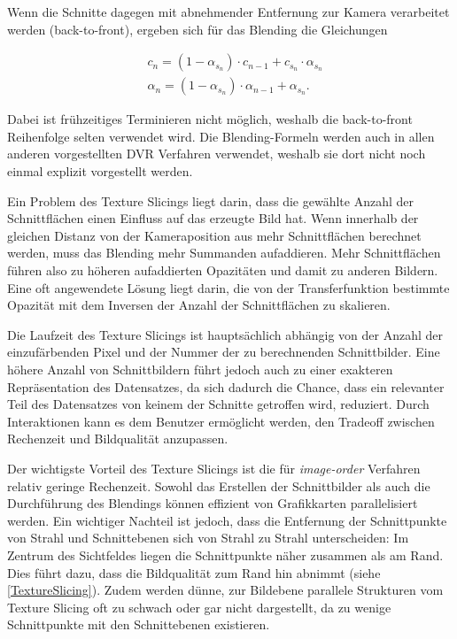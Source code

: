 \documentclass[a4paper,fontsize=12pt,toc=bib,parskip=half,ngerman]{scrartcl}
\begin{document}
Wenn die Schnitte dagegen mit abnehmender Entfernung zur Kamera verarbeitet werden (back-to-front), ergeben sich f\"ur das Blending die Gleichungen

\begin{align}
&c_n = (1-\alpha_{s_n})\cdot c_{n-1}+c_{s_n}\cdot\alpha_{s_n}
\label{back-to-front-color}\\ 
&\alpha_n = (1-\alpha_{s_n})\cdot\alpha_{n-1} + \alpha_{s_n}.
\label{back-to-front-alpha}
\end{align}

Dabei ist fr\"uhzeitiges Terminieren nicht m\"oglich, weshalb die back-to-front Reihenfolge selten verwendet wird. Die Blending-Formeln werden auch in allen anderen vorgestellten DVR Verfahren verwendet, weshalb sie dort nicht noch einmal explizit vorgestellt werden.

Ein Problem des Texture Slicings liegt darin, dass die gew\"ahlte Anzahl der Schnittfl\"achen einen Einfluss auf das erzeugte Bild hat. Wenn innerhalb der gleichen Distanz von der Kameraposition aus mehr Schnittfl\"achen berechnet werden, muss das Blending mehr Summanden aufaddieren. Mehr Schnittfl\"achen f\"uhren also zu h\"oheren aufaddierten Opazit\"aten und damit zu anderen Bildern. Eine oft angewendete L\"osung liegt darin, die von der Transferfunktion bestimmte Opazit\"at mit dem Inversen der Anzahl der Schnittfl\"achen zu skalieren.

Die Laufzeit des Texture Slicings ist haupts\"achlich abh\"angig von der Anzahl der einzuf\"arbenden Pixel und der Nummer der zu berechnenden Schnittbilder. Eine h\"ohere Anzahl von Schnittbildern f\"uhrt jedoch auch zu einer exakteren Repr\"asentation des Datensatzes, da sich dadurch die Chance, dass ein relevanter Teil des Datensatzes von keinem der Schnitte getroffen wird, reduziert. Durch Interaktionen kann es dem Benutzer erm\"oglicht werden, den Tradeoff zwischen Rechenzeit und Bildqualit\"at anzupassen.

Der wichtigste Vorteil des Texture Slicings ist die f\"ur \textit{image-order} Verfahren relativ geringe Rechenzeit. Sowohl das Erstellen der Schnittbilder als auch die Durchf\"uhrung des Blendings k\"onnen effizient von Grafikkarten parallelisiert werden. Ein wichtiger Nachteil ist jedoch, dass die Entfernung der Schnittpunkte von Strahl und Schnittebenen sich von Strahl zu Strahl unterscheiden: Im Zentrum des Sichtfeldes liegen die Schnittpunkte n\"aher zusammen als am Rand. Dies f\"uhrt dazu, dass die Bildqualit\"at zum Rand hin abnimmt (siehe \cref{TextureSlicing}). Zudem werden d\"unne, zur Bildebene parallele Strukturen vom Texture Slicing oft zu schwach oder gar nicht dargestellt, da zu wenige Schnittpunkte mit den Schnittebenen existieren.
\end{document}
